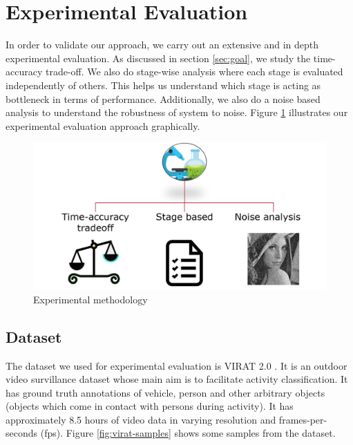 \section{Experimental Evaluation}
In order to validate our approach, we carry out an extensive and in depth experimental evaluation. As discussed in section \ref{sec:goal}, we study the time-accuracy trade-off. We also do stage-wise analysis where each stage is evaluated independently of others. This helps us understand which stage is acting as bottleneck in terms of performance. Additionally, we also do a noise based analysis to understand the robustness of system to noise. Figure \ref{fig:experimental-methdology} illustrates our experimental evaluation approach graphically. 

\begin{figure}
    \centering
    \includegraphics[width=\linewidth]{images/experimental-methdology.PNG}
    \caption{Experimental methodology }
    \label{fig:experimental-methdology}
\end{figure}

\subsection{Dataset}
The dataset we used for experimental evaluation is VIRAT 2.0 \cite{virat20}. It is an outdoor video survillance dataset whose main aim is to facilitate activity classification. It has ground truth annotations of vehicle, person and other arbitrary objects (objects which come in contact with persons during activity). It has approximately 8.5 hours of video data in varying resolution and frames-per-seconds (fps). Figure \ref{fig:virat-samples} shows some samples from the dataset. 

